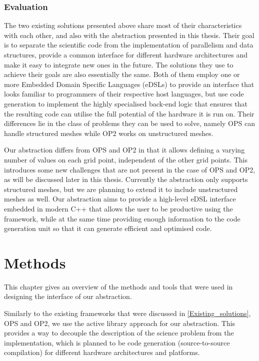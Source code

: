 \documentclass[fontsize=11pt, appendixprefix=true]{scrreprt}
\begin{document}
\subsection{Evaluation}

The two existing solutions presented above share most of their characteristics
with each other, and also with the abstraction presented in this thesis. Their
goal is to separate the scientific code from the implementation of parallelism
and data structures, provide a common interface for different hardware
architectures and make it easy to integrate new ones in the future. The
solutions they use to achieve their goals are also essentially the same. Both of
them employ one or more Embedded Domain Specific Languages (eDSLs) to provide an
interface that looks familiar to programmers of their respective host languages,
but use code generation to implement the highly specialised back-end logic that
ensures that the resulting code can utilise the full potential of the hardware
it is run on. Their differences lie in the class of problems they can be used to
solve, namely OPS can handle structured meshes while OP2 works on unstructured
meshes.

Our abstraction differs from OPS and OP2 in that it allows defining a varying
number of values on each grid point, independent of the other grid points. This
introduces some new challenges that are not present in the case of OPS and OP2,
as will be discussed later in this thesis. Currently the abstraction only
supports structured meshes, but we are planning to extend it to include
unstructured meshes as well. Our abstraction aims to provide a high-level eDSL
interface embedded in modern C++ that allows the user to be productive using the
framework, while at the same time providing enough information to the code
generation unit so that it can generate efficient and optimised code.

\chapter{Methods}

This chapter gives an overview of the methods and tools that were used in
designing the interface of our abstraction.

Similarly to the existing frameworks that were discussed in
\autoref{Existing_solutions}, OPS and OP2, we use the active library approach
for our abstraction. This provides a way to decouple the description of the
science problem from the implementation, which is planned to be code generation
(source-to-source compilation) for different hardware architectures and
platforms.
\end{document}
